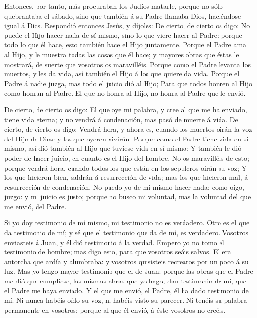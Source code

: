  Entonces, por tanto, más procuraban los Judíos matarle,
porque no sólo quebrantaba el sábado, sino que también á su Padre
llamaba Dios, haciéndose igual á Dios.  Respondió entonces
Jesús, y díjoles: De cierto, de cierto os digo: No puede el Hijo hacer
nada de sí mismo, sino lo que viere hacer al Padre: porque todo lo que
él hace, esto también hace el Hijo juntamente.  Porque el
Padre ama al Hijo, y le muestra todas las cosas que él hace; y mayores
obras que éstas le mostrará, de suerte que vosotros os maravilléis.
 Porque como el Padre levanta los muertos, y les da vida,
así también el Hijo á los que quiere da vida.  Porque el
Padre á nadie juzga, mas todo el juicio dió al Hijo;  Para
que todos honren al Hijo como honran al Padre. El que no honra al Hijo,
no honra al Padre que le envió.

 De cierto, de cierto os digo: El que oye mi palabra, y
cree al que me ha enviado, tiene vida eterna; y no vendrá á condenación,
mas pasó de muerte á vida.  De cierto, de cierto os digo:
Vendrá hora, y ahora es, cuando los muertos oirán la voz del Hijo de
Dios: y los que oyeren vivirán.  Porque como el Padre tiene
vida en sí mismo, así dió también al Hijo que tuviese vida en sí mismo:
 Y también le dió poder de hacer juicio, en cuanto es el
Hijo del hombre.  No os maravilléis de esto; porque vendrá
hora, cuando todos los que están en los sepulcros oirán su voz;
 Y los que hicieron bien, saldrán á resurrección de vida;
mas los que hicieron mal, á resurrección de condenación. 
No puedo yo de mí mismo hacer nada: como oigo, juzgo: y mi juicio es
justo; porque no busco mi voluntad, mas la voluntad del que me envió,
del Padre.

 Si yo doy testimonio de mí mismo, mi testimonio no es
verdadero.  Otro es el que da testimonio de mí; y sé que el
testimonio que da de mí, es verdadero.  Vosotros enviasteis
á Juan, y él dió testimonio á la verdad.  Empero yo no tomo
el testimonio de hombre; mas digo esto, para que vosotros seáis salvos.
 El era antorcha que ardía y alumbraba: y vosotros
quisisteis recrearos por un poco á su luz.  Mas yo tengo
mayor testimonio que el de Juan: porque las obras que el Padre me dió
que cumpliese, las mismas obras que yo hago, dan testimonio de mí, que
el Padre me haya enviado.  Y el que me envió, el Padre, él
ha dado testimonio de mí. Ni nunca habéis oído su voz, ni habéis visto
su parecer.  Ni tenéis su palabra permanente en vosotros;
porque al que él envió, á éste vosotros no creéis.


